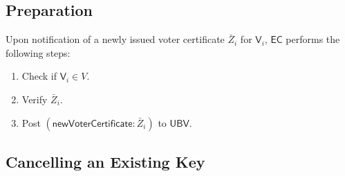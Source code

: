 \documentclass[bibtotoc,halfparskip,oneside]{scrreprt}
\newcommand{\EC}{\ensuremath{\mathsf{EC}}\xspace}
\newcommand{\UBV}{\ensuremath{\mathsf{UBV}}\xspace}
\newcommand{\Voter}[1]{\ensuremath{\mathsf{V}_{#1}}\xspace}
\begin{document}
	\subsection{Preparation}
	
	Upon notification of a newly issued voter certificate $\bar{Z}_i$ for $\Voter{i}$, \EC performs the following steps:
	\begin{enumerate}
		\item Check if $\Voter{i}\in V$.
		\item Verify $\bar{Z}_i$.
		\item Post $(\mathsf{newVoterCertificate}:\bar{Z}_i)$ to \UBV. 
	\end{enumerate}
	
	\subsection{Cancelling an Existing Key}\label{cancelling}
	
\end{document}

